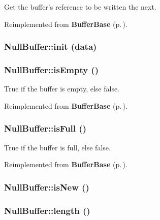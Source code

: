 Get the buffer's reference to be written the next. 



Reimplemented from {\bf Buffer\-Base} {\rm (p.\,\pageref{classBufferBase_BufferBasea8})}.
\subsubsection{\setlength{\rightskip}{0pt plus 5cm}Null\-Buffer::init (data)}\label{classNullBuffer_NullBuffera1}


\subsubsection{\setlength{\rightskip}{0pt plus 5cm}Null\-Buffer::is\-Empty ()}\label{classNullBuffer_NullBuffera7}


True if the buffer is empty, else false. 



Reimplemented from {\bf Buffer\-Base} {\rm (p.\,\pageref{classBufferBase_BufferBasea5})}.
\subsubsection{\setlength{\rightskip}{0pt plus 5cm}Null\-Buffer::is\-Full ()}\label{classNullBuffer_NullBuffera6}


True if the buffer is full, else false. 



Reimplemented from {\bf Buffer\-Base} {\rm (p.\,\pageref{classBufferBase_BufferBasea4})}.
\subsubsection{\setlength{\rightskip}{0pt plus 5cm}Null\-Buffer::is\-New ()}\label{classNullBuffer_NullBuffera8}


\subsubsection{\setlength{\rightskip}{0pt plus 5cm}Null\-Buffer::length ()}\label{classNullBuffer_NullBuffera3}


